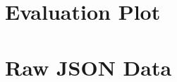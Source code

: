 \documentclass[twoside=false,11pt,paper=a4]{jureap}
\begin{document}
\pagestyle{main}
\maketitle
\section{Evaluation Plot}





\clearpage

\section{Raw JSON Data}


\end{document}
